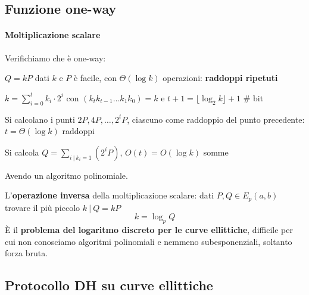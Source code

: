 \documentclass[10pt]{book}
\begin{document}
\subsection{Funzione one-way}
\paragraph{Moltiplicazione scalare} Verifichiamo che è one-way:
\begin{list}{}{}
	\item $Q = kP$ dati $k$ e $P$ è facile, con $\Theta(\log k)$ operazioni: \textbf{raddoppi ripetuti}
	\begin{list}{}{}
		\item $k = \sum_{i=0}^t k_i\cdot2^i$ con $(k_t k_{t-1}\ldots k_1 k_0) = k$ e $t + 1 = \lfloor \log_2 k\rfloor + 1$ \# bit
		\item Si calcolano i punti $2P, 4P,\ldots, 2^t P$, ciascuno come raddoppio del punto precedente: $t = \Theta(\log k)$ raddoppi
		\item Si calcola $Q = \sum_{i\:|\:k_i = 1} (2^i P)$, $O(t) = O(\log k)$ somme
	\end{list}
	Avendo un algoritmo polinomiale.
\end{list}
L'\textbf{operazione inversa} della moltiplicazione scalare: dati $P,Q\in E_p(a,b)$ trovare il più piccolo $k\:|\: Q = kP$ $$k = \log_p Q$$
È il \textbf{problema del logaritmo discreto per le curve ellittiche}, difficile per cui non conosciamo algoritmi polinomiali e nemmeno subesponenziali, soltanto forza bruta.
\subsection{Protocollo DH su curve ellittiche}
\end{document}
